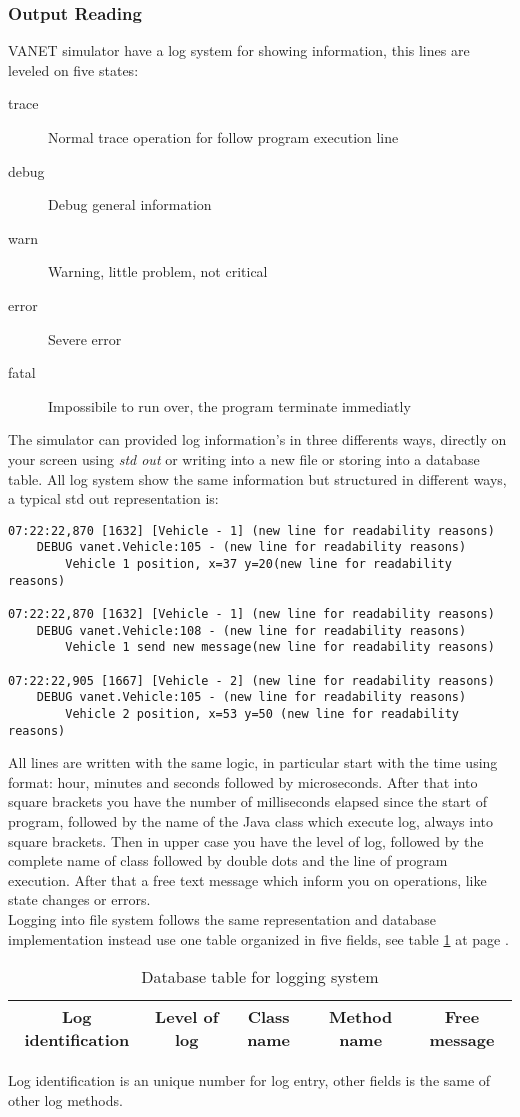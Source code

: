 \subsubsection{Output Reading}
VANET simulator have a log system for showing information, this lines are leveled on five states:
\begin{description}
	\item [trace] Normal trace operation for follow program execution line
	\item [debug] Debug general information
	\item [warn] Warning, little problem, not critical
	\item [error] Severe error
	\item [fatal] Impossibile to run over, the program terminate immediatly
\end{description}
The simulator can provided log  information's in three differents ways, directly on your screen using \textit{std out} or writing into a new file or storing into a database table. All log system show the same information but structured in different ways, a typical std out representation is:
\begin{verbatim}
07:22:22,870 [1632] [Vehicle - 1] (new line for readability reasons)
	DEBUG vanet.Vehicle:105 - (new line for readability reasons)
		Vehicle 1 position, x=37 y=20(new line for readability reasons)
		
07:22:22,870 [1632] [Vehicle - 1] (new line for readability reasons)
	DEBUG vanet.Vehicle:108 - (new line for readability reasons)
		Vehicle 1 send new message(new line for readability reasons)
		
07:22:22,905 [1667] [Vehicle - 2] (new line for readability reasons)
	DEBUG vanet.Vehicle:105 - (new line for readability reasons)
		Vehicle 2 position, x=53 y=50 (new line for readability reasons)
\end{verbatim}
All lines are written with the same logic, in particular start with the time using format: hour, minutes and seconds followed by microseconds. After that into square brackets you have the number of milliseconds elapsed since the start of program, followed by the name of the Java class which execute log, always into square brackets. Then in upper case you have the level of log, followed by the complete name of class followed by double dots and the line of program execution. After that a free text message which inform you on operations, like state changes or errors.\\
Logging into file system follows the same representation and database implementation instead use one table organized in five fields, see table \ref{tab:DBLog} at page \pageref{tab:DBLog}.
\begin{table}[!ht]
	\centering
	\caption{Database table for logging system}
	\begin{tabular}{|c|c|c|c|c|}
	\hline\hline 
	\textbf{Log identification} & \textbf{Level of log} & \textbf{Class name} & \textbf{Method name} & \textbf{Free message}\\
	\hline
	\hline     %
 	\end{tabular} 
	\label{tab:DBLog}
\end{table}
Log identification is an unique number for log entry, other fields is the same of other log methods.
